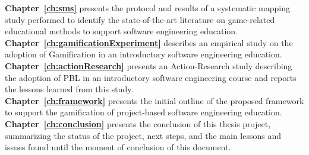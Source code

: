 \noindent
\textbf{Chapter~\ref{ch:sms}} presents the protocol and results of a systematic mapping study performed to identify the state-of-the-art literature on game-related educational methods to support software engineering education.\\

\noindent
\textbf{Chapter~\ref{ch:gamificationExperiment}} describes an empirical study on the adoption of Gamification in an introductory software engineering education.\\

\noindent
\textbf{Chapter~\ref{ch:actionResearch}} presents an Action-Research study describing the adoption of PBL in an introductory software engineering course and reports the lessons learned from this study.\\

\noindent
\textbf{Chapter~\ref{ch:framework}} presents the initial outline of the proposed framework to support the gamification of project-based software engineering education.\\ 

\noindent
\textbf{Chapter~\ref{ch:conclusion}} presents the conclusion of this thesis project, summarizing the status of the project, next steps, and the main lessons and issues found until the moment of conclusion of this document.